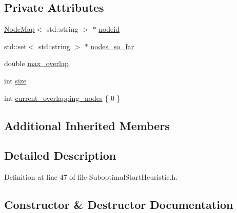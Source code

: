 \subsection*{Private Attributes}
\begin{DoxyCompactItemize}
\item 
\hyperlink{namespacederegnet_ae102b707ae1d6f83c639ece5e0dd5658}{Node\+Map}$<$ std\+::string $>$ $\ast$ \hyperlink{classderegnet_1_1SuboptimalStartHeuristic_a8928f9630eb2ffbd557e95b62c278103}{nodeid}
\item 
std\+::set$<$ std\+::string $>$ $\ast$ \hyperlink{classderegnet_1_1SuboptimalStartHeuristic_af9a38b598d55b9a1fa22b9f0c141218b}{nodes\+\_\+so\+\_\+far}
\item 
double \hyperlink{classderegnet_1_1SuboptimalStartHeuristic_ab7da09c5dc0c3fd13e19d254319ab3ba}{max\+\_\+overlap}
\item 
int \hyperlink{classderegnet_1_1SuboptimalStartHeuristic_a8645bf64e5cd06e7c432eb7b38f3d80a}{size}
\item 
int \hyperlink{classderegnet_1_1SuboptimalStartHeuristic_a422ca9127a469117bab51ae3eb2fbdcf}{current\+\_\+overlapping\+\_\+nodes} \{ 0 \}
\end{DoxyCompactItemize}
\subsection*{Additional Inherited Members}


\subsection{Detailed Description}


Definition at line 47 of file Suboptimal\+Start\+Heuristic.\+h.



\subsection{Constructor \& Destructor Documentation}
